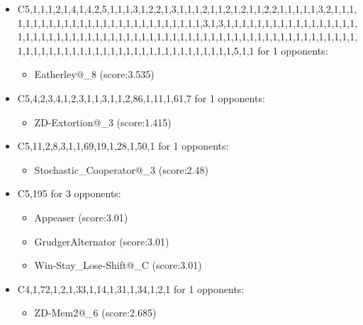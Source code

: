 \begin{appendices}
\begin{itemize}
        \item C5,1,1,1,2,1,4,1,4,2,5,1,1,1,3,1,2,2,1,3,1,1,1,2,1,1,2,1,2,1,1,2,2,1,1,1,1,1,3,2,1,1,1,1,1,1,1,1,1,1,1,1,1,1,1,1,1,1,1,1,1,1,1,1,1,1,1,3,1,3,1,1,1,1,1,1,1,1,1,1,1,1,1,1,1,1,1,1,1,1,1,1,1,1,1,1,1,1,1,1,1,1,1,1,1,1,1,1,1,1,1,1,1,1,1,1,1,1,1,1,1,1,1,1,1,1,1,1,1,1,1,1,1,1,1,1,1,1,1,1,1,1,1,1,1,1,1,1,1,1,1,1,1,1,1,1,1,1,1,5,1,1 for 1 opponents:
        \begin{multicols}{3}
            \begin{itemize}
                \item Eatherley@\_8 (score:3.535)
            \end{itemize}
        \end{multicols}

        \item C5,4,2,3,4,1,2,3,1,1,3,1,1,2,86,1,11,1,61,7 for 1 opponents:
        \begin{multicols}{3}
            \begin{itemize}
                \item ZD-Extortion@\_3 (score:1.415)
            \end{itemize}
        \end{multicols}

        \item C5,11,2,8,3,1,1,69,19,1,28,1,50,1 for 1 opponents:
        \begin{multicols}{3}
            \begin{itemize}
                \item Stochastic\_Cooperator@\_3 (score:2.48)
            \end{itemize}
        \end{multicols}

        \item C5,195 for 3 opponents:
        \begin{multicols}{3}
            \begin{itemize}
                \item Appeaser (score:3.01)
                \item GrudgerAlternator (score:3.01)
                \item Win-Stay\_Lose-Shift@\_C (score:3.01)
            \end{itemize}
        \end{multicols}

        \item C4,1,72,1,2,1,33,1,14,1,31,1,34,1,2,1 for 1 opponents:
        \begin{multicols}{3}
            \begin{itemize}
                \item ZD-Mem2@\_6 (score:2.685)
            \end{itemize}
        \end{multicols}


\end{itemize}
\end{appendices}
